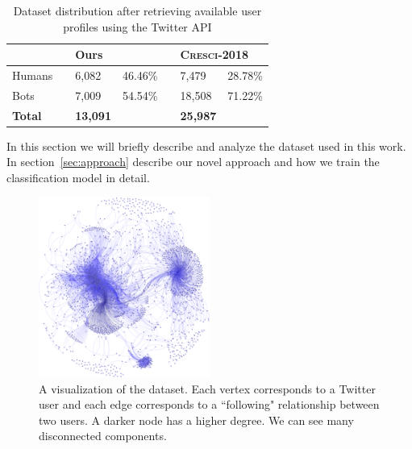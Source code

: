 \begin{table}[t]
\centering
\begin{tabular}{@{}lllllll@{}}
\toprule
       &  & \multicolumn{2}{l}{Ours} &  & \multicolumn{2}{l}{\textsc{Cresci-2018}} \\ \midrule
Humans &  & 6,082       & 46.46\%     &  & 7,479          & 28.78\%         \\
Bots   &  & 7,009       & 54.54\%     &  & 18,508         & 71.22\%         \\ \midrule
\textbf{Total}  &  & \textbf{13,091}      &        &  & \textbf{25,987}         &            \\ \bottomrule
\end{tabular}
\caption{Dataset distribution after retrieving available user profiles using the Twitter API}
\label{tab:dataset}
\end{table}

In this section we will briefly describe and analyze the dataset used in this work. In section~\ref{sec:approach} describe our novel approach and how we train the classification model in detail.

\begin{figure}[t!]
    \centering
    \includegraphics[width=0.5\textwidth]{FIG/graph-crop.pdf}
    \caption{A visualization of the dataset. Each vertex corresponds to a Twitter user and each edge corresponds to a ``following" relationship between two users. A darker node has a higher degree. We can see many disconnected components.}
    \label{fig:twitter}
\end{figure}

